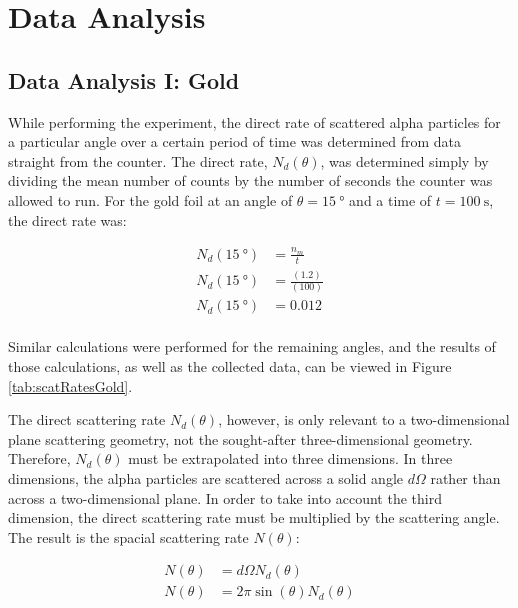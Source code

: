 \documentclass[a4paper]{article}
\begin{document}
\section{Data Analysis}

\subsection{Data Analysis I: Gold}

\qq While performing the experiment, the direct rate of scattered alpha
particles for a particular angle over a certain period of time was determined
from data straight from the counter. The direct rate, \( N_d (\theta) \), was
determined simply by dividing the mean number of counts by the number of seconds
the counter was allowed to run. For the gold foil at an angle of
\( \theta = \SI{15}{\degree} \) and a time of \( t = \SI{100}{\second} \), the
direct rate was:

\begin{align*}
  N_d (\SI{15}{\degree}) &= \frac{n_m}{t} \\
  N_d (\SI{15}{\degree}) &= \frac{(1.2)}{(100)} \\
  N_d (\SI{15}{\degree}) &= \num{0.012} \\
\end{align*}

Similar calculations were performed for the remaining angles, and the results of
those calculations, as well as the collected data, can be viewed in Figure
\ref{tab:scatRatesGold}.

\qq The direct scattering rate \( N_d (\theta) \), however, is only relevant to
a two-dimensional plane scattering geometry, not the sought-after
three-dimensional geometry. Therefore, \( N_d (\theta) \) must be extrapolated
into three dimensions. In three dimensions, the alpha particles are scattered
across a solid angle \( d\Omega \) rather than across a two-dimensional
plane. In order to take into account the third dimension, the direct scattering
rate must be multiplied by the scattering angle. The result is the spacial
scattering rate \( N (\theta) \):

\begin{align*}
  N (\theta) &= d\Omega N_d (\theta) \\
  N (\theta) &= 2 \pi \sin{(\theta)} N_d (\theta) \\
\end{align*}
\end{document}
